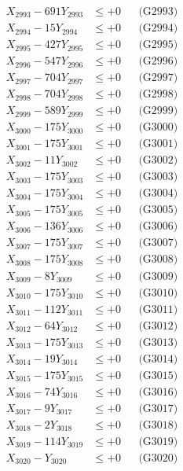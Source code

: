 \documentclass[a4paper,10pt]{article}
\begin{document}
{\begin{align}
X_{2993} - 691Y_{2993} &\leq +0 && \text{(G2993)} \\
X_{2994} - 15Y_{2994} &\leq +0 && \text{(G2994)} \\
X_{2995} - 427Y_{2995} &\leq +0 && \text{(G2995)} \\
X_{2996} - 547Y_{2996} &\leq +0 && \text{(G2996)} \\
X_{2997} - 704Y_{2997} &\leq +0 && \text{(G2997)} \\
X_{2998} - 704Y_{2998} &\leq +0 && \text{(G2998)} \\
X_{2999} - 589Y_{2999} &\leq +0 && \text{(G2999)} \\
X_{3000} - 175Y_{3000} &\leq +0 && \text{(G3000)} \\
\allowbreak
X_{3001} - 175Y_{3001} &\leq +0 && \text{(G3001)} \\
X_{3002} - 11Y_{3002} &\leq +0 && \text{(G3002)} \\
X_{3003} - 175Y_{3003} &\leq +0 && \text{(G3003)} \\
X_{3004} - 175Y_{3004} &\leq +0 && \text{(G3004)} \\
X_{3005} - 175Y_{3005} &\leq +0 && \text{(G3005)} \\
X_{3006} - 136Y_{3006} &\leq +0 && \text{(G3006)} \\
X_{3007} - 175Y_{3007} &\leq +0 && \text{(G3007)} \\
X_{3008} - 175Y_{3008} &\leq +0 && \text{(G3008)} \\
X_{3009} - 8Y_{3009} &\leq +0 && \text{(G3009)} \\
X_{3010} - 175Y_{3010} &\leq +0 && \text{(G3010)} \\
\allowbreak
X_{3011} - 112Y_{3011} &\leq +0 && \text{(G3011)} \\
X_{3012} - 64Y_{3012} &\leq +0 && \text{(G3012)} \\
X_{3013} - 175Y_{3013} &\leq +0 && \text{(G3013)} \\
X_{3014} - 19Y_{3014} &\leq +0 && \text{(G3014)} \\
X_{3015} - 175Y_{3015} &\leq +0 && \text{(G3015)} \\
X_{3016} - 74Y_{3016} &\leq +0 && \text{(G3016)} \\
X_{3017} - 9Y_{3017} &\leq +0 && \text{(G3017)} \\
X_{3018} - 2Y_{3018} &\leq +0 && \text{(G3018)} \\
X_{3019} - 114Y_{3019} &\leq +0 && \text{(G3019)} \\
X_{3020} - Y_{3020} &\leq +0 && \text{(G3020)} \\

\end{align}}
\end{document}
